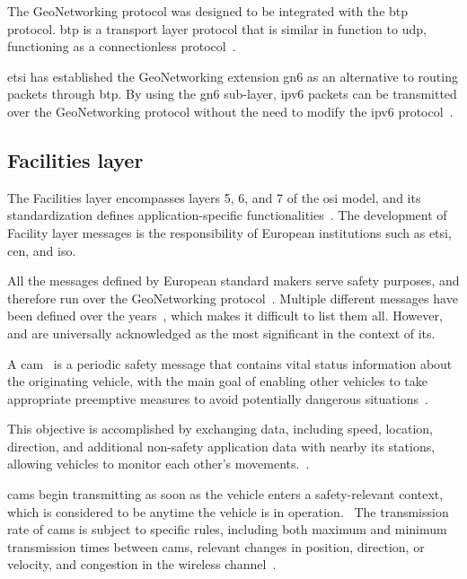 The GeoNetworking protocol was designed to be integrated with the \gls{btp} protocol. \gls{btp} is a transport layer protocol that is similar in function to \gls{udp}, functioning as a connectionless protocol~\cite{festag_cooperative_2014}.

\gls{etsi} has established the GeoNetworking extension \gls{gn6} as an alternative to routing packets through \gls{btp}. By using the \gls{gn6} sub-layer, \gls{ipv6} packets can be transmitted over the GeoNetworking protocol without the need to modify the \gls{ipv6} protocol~\cite{festag_cooperative_2014}.


\subsection[Facilities layer]{Facilities layer}
\label{subsec:Facilities}

The Facilities layer encompasses layers 5, 6, and 7 of the \gls{osi} model, and its standardization defines application-specific functionalities~\cite{festag_standards_2015}. The development of Facility layer messages is the responsibility of European institutions such as \gls{etsi}, \gls{cen}, and \gls{iso}.

All the messages defined by European standard makers serve safety purposes, and therefore run over the GeoNetworking protocol~\cite{festag_standards_2015}. Multiple different messages have been defined over the years~\cite{festag_cooperative_2014}, which makes it difficult to list them all. However,  and  are universally acknowledged as the most significant in the context of \gls{its}.

A \gls{cam}~\cite{etsi_intelligent_2019-2} is a periodic safety message that contains vital status information about the originating vehicle, with the main goal of enabling other vehicles to take appropriate preemptive measures to avoid potentially dangerous situations~\cite{al-sultan_comprehensive_2014}.

This objective is accomplished by exchanging data, including speed, location, direction, and additional non-safety application data with nearby \gls{its} stations, allowing vehicles to monitor each other's movements.~\cite{festag_standards_2015}.

\glspl{cam} begin transmitting as soon as the vehicle enters a safety-relevant context, which is considered to be anytime the vehicle is in operation.~\cite{festag_cooperative_2014} The transmission rate of \glspl{cam} is subject to specific rules, including both maximum and minimum transmission times between \glspl{cam}, relevant changes in position, direction, or velocity, and congestion in the wireless channel~\cite{festag_cooperative_2014}.

